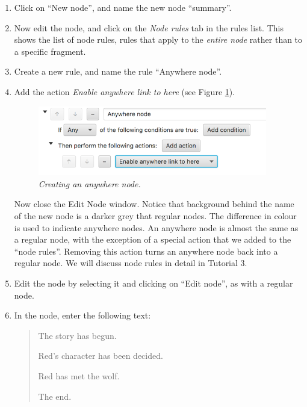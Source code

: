 \documentclass{article}
\begin{document}
\begin{enumerate}
  \item Click on ``New node'', and name the new node ``summary''. 
  \item Now edit the node, and click on the \textit{Node rules} tab in the rules list. This shows the list of node rules, rules that apply to the \textit{entire node} rather than to a specific fragment.
  \item Create a new rule, and name the rule ``Anywhere node''.
  \item Add the action \textit{Enable anywhere link to here} (see Figure \ref{fig:tut2:anywherenode}).

\begin{figure}[h]
  \centering
  \includegraphics[width=10cm]{images/hypedyn-tutorial-2-figure-9}
  \caption{\textit{Creating an anywhere node.}}
  \label{fig:tut2:anywherenode}
\end{figure} 

\noindent Now close the Edit Node window. Notice that background behind the name of the new node is a darker grey that regular nodes. The difference in colour is used to indicate anywhere nodes. An anywhere node is almost the same as a regular node, with the exception of a special action that we added to the ``node rules''. Removing this action turns an anywhere node back into a regular node. We will discuss node rules in detail in Tutorial 3.

  \item Edit the node by selecting it and clicking on ``Edit node'', as with a regular node.

  \item In the node, enter the following text:
  \begin{quotation}
  \noindent The story has begun.
  
  \bigskip
  
  \noindent Red's character has been decided.

  \bigskip

  \noindent Red has met the wolf.

  \bigskip

  \noindent The end.
  \end{quotation}
\end{enumerate}
\end{document}
